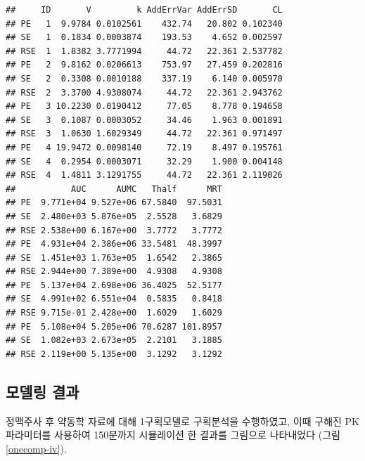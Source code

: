 \documentclass[
  11pt,
  krantz2, a4paper, twoside]{krantz}
\theoremstyle{definition}
\theoremstyle{definition}
\theoremstyle{definition}
\theoremstyle{definition}
\theoremstyle{remark}
\begin{document}
\begin{verbatim}
##     ID       V         k AddErrVar AddErrSD       CL
## PE   1  9.9784 0.0102561    432.74   20.802 0.102340
## SE   1  0.1834 0.0003874    193.53    4.652 0.002597
## RSE  1  1.8382 3.7771994     44.72   22.361 2.537782
## PE   2  9.8162 0.0206613    753.97   27.459 0.202816
## SE   2  0.3308 0.0010188    337.19    6.140 0.005970
## RSE  2  3.3700 4.9308074     44.72   22.361 2.943762
## PE   3 10.2230 0.0190412     77.05    8.778 0.194658
## SE   3  0.1087 0.0003052     34.46    1.963 0.001891
## RSE  3  1.0630 1.6029349     44.72   22.361 0.971497
## PE   4 19.9472 0.0098140     72.19    8.497 0.195761
## SE   4  0.2954 0.0003071     32.29    1.900 0.004148
## RSE  4  1.4811 3.1291755     44.72   22.361 2.119026
##           AUC      AUMC   Thalf      MRT
## PE  9.771e+04 9.527e+06 67.5840  97.5031
## SE  2.480e+03 5.876e+05  2.5528   3.6829
## RSE 2.538e+00 6.167e+00  3.7772   3.7772
## PE  4.931e+04 2.386e+06 33.5481  48.3997
## SE  1.451e+03 1.763e+05  1.6542   2.3865
## RSE 2.944e+00 7.389e+00  4.9308   4.9308
## PE  5.137e+04 2.698e+06 36.4025  52.5177
## SE  4.991e+02 6.551e+04  0.5835   0.8418
## RSE 9.715e-01 2.428e+00  1.6029   1.6029
## PE  5.108e+04 5.205e+06 70.6287 101.8957
## SE  1.082e+03 2.673e+05  2.2101   3.1885
## RSE 2.119e+00 5.135e+00  3.1292   3.1292
\end{verbatim}

\hypertarget{uxbaa8uxb378uxb9c1-uxacb0uxacfc-1}{%
\subsection{모델링 결과}\label{uxbaa8uxb378uxb9c1-uxacb0uxacfc-1}}

정맥주사 후 약동학 자료에 대해 1구획모델로 구획분석을 수행하였고, 이때 구해진 PK 파라미터를 사용하여 150분까지 시뮬레이션 한 결과를 그림으로 나타내었다 (그림 \ref{onecomp-iv}). 
\end{document}
